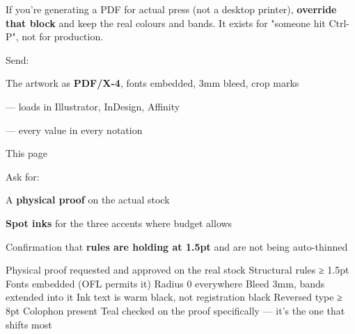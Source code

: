 \documentclass[fontpath=fonts/,logopath=logo/]{riposte-doc}
\begin{document}
If you're generating a PDF for actual press (not a desktop printer), \textbf{override that block} and keep the real colours and bands. It exists for "someone hit Ctrl-P", not for production.



Send:

\begin{ripnumbers}
\item The artwork as \textbf{PDF/X-4}, fonts embedded, 3mm bleed, crop marks
\item {} — loads in Illustrator, InDesign, Affinity
\item {} — every value in every notation
\item This page
\end{ripnumbers}

Ask for:

\begin{ripbullets}
\item A \textbf{physical proof} on the actual stock
\item \textbf{Spot inks} for the three accents where budget allows
\item Confirmation that \textbf{rules are holding at 1.5pt} and are not being auto-thinned
\end{ripbullets}



\begin{riptodolist}
\riptodo Physical proof requested and approved on the real stock
\riptodo Structural rules ≥ 1.5pt
\riptodo Fonts embedded (OFL permits it)
\riptodo Radius 0 everywhere
\riptodo Bleed 3mm, bands extended into it
\riptodo Ink text is warm black, not registration black
\riptodo Reversed type ≥ 8pt
\riptodo Colophon present
\riptodo Teal checked on the proof specifically — it's the one that shifts most
\end{riptodolist}

\ripend
\end{document}
